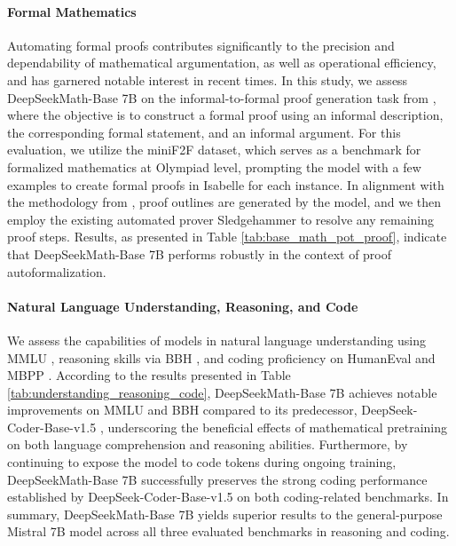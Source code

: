 \begin{itemize}[topsep=0pt]
\paragraph{Formal Mathematics}

Automating formal proofs contributes significantly to the precision and dependability of mathematical argumentation, as well as operational efficiency, and has garnered notable interest in recent times. In this study, we assess DeepSeekMath-Base 7B on the informal-to-formal proof generation task from \citep{dsp_proof}, where the objective is to construct a formal proof using an informal description, the corresponding formal statement, and an informal argument. For this evaluation, we utilize the miniF2F \citep{minif2f} dataset, which serves as a benchmark for formalized mathematics at Olympiad level, prompting the model with a few examples to create formal proofs in Isabelle for each instance. In alignment with the methodology from \cite{dsp_proof}, proof outlines are generated by the model, and we then employ the existing automated prover Sledgehammer \citep{sledgehammer} to resolve any remaining proof steps. Results, as presented in Table \ref{tab:base_math_pot_proof}, indicate that DeepSeekMath-Base 7B performs robustly in the context of proof autoformalization.

\paragraph{Natural Language Understanding, Reasoning, and Code}

We assess the capabilities of models in natural language understanding using MMLU \citep{mmlu}, reasoning skills via BBH \citep{bbh}, and coding proficiency on HumanEval \citep{codex} and MBPP \citep{mbpp}. According to the results presented in Table \ref{tab:understanding_reasoning_code}, DeepSeekMath-Base 7B achieves notable improvements on MMLU and BBH compared to its predecessor, DeepSeek-Coder-Base-v1.5 \citep{deepseek-coder}, underscoring the beneficial effects of mathematical pretraining on both language comprehension and reasoning abilities. Furthermore, by continuing to expose the model to code tokens during ongoing training, DeepSeekMath-Base 7B successfully preserves the strong coding performance established by DeepSeek-Coder-Base-v1.5 on both coding-related benchmarks. In summary, DeepSeekMath-Base 7B yields superior results to the general-purpose Mistral 7B model \citep{mistral} across all three evaluated benchmarks in reasoning and coding.


\end{itemize}
